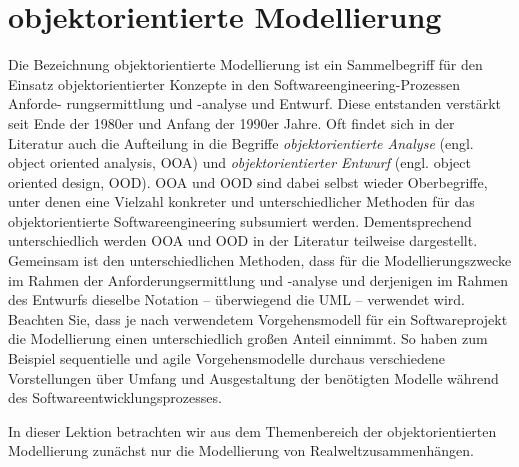 \section{objektorientierte Modellierung}
\label{sec:Kap-3.2}

Die  Bezeichnung objektorientierte Modellierung ist ein Sammelbegriff für den Einsatz objektorientierter Konzepte in den Software\-engineering-Prozessen Anforde-
\linebreak %
rungsermittlung und -analyse und Entwurf. Diese entstanden verstärkt seit Ende der 1980er und Anfang der 1990er Jahre. Oft findet sich in der Literatur auch die Aufteilung in die Begriffe \textit{objektorientierte Analyse} (engl. object oriented analysis, 
OOA) und \textit{objektorientierter Entwurf} (engl. object oriented design, OOD). OOA und OOD sind dabei selbst wieder Oberbegriffe, unter denen eine Vielzahl konkreter und unterschiedlicher Methoden für das objektorientierte Softwareengineering subsumiert werden. Dementsprechend unterschiedlich werden OOA und OOD in der Literatur teilweise dargestellt. Gemeinsam ist den unterschiedlichen Methoden, dass für die Modellierungszwecke im Rahmen der Anforderungsermittlung und -analyse und derjenigen im Rahmen des Entwurfs dieselbe Notation – überwiegend die UML – verwendet wird. Beachten Sie, dass je nach verwendetem Vorgehensmodell für ein Softwareprojekt die Modellierung einen unterschiedlich großen Anteil einnimmt. So haben zum Beispiel sequentielle und agile Vorgehensmodelle durchaus verschiedene Vorstellungen über Umfang und Ausgestaltung der benötigten Modelle während des Softwareentwicklungsprozesses.

In dieser Lektion betrachten wir aus dem Themenbereich der objektorientierten Modellierung zunächst nur die Modellierung von Realweltzusammenhängen. 

